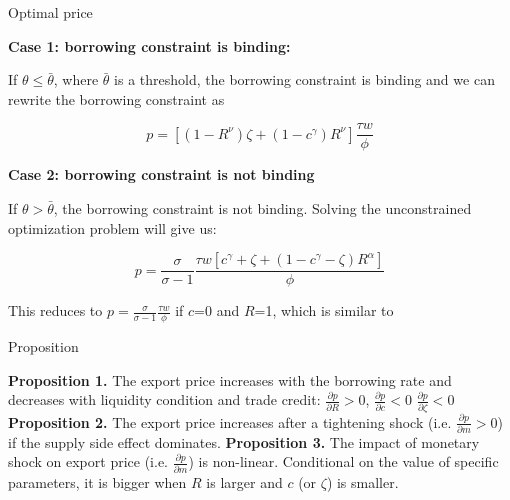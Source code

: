 \documentclass[10pt]{beamer}
\begin{document}
\begin{frame}{Optimal price}

\textbf{Case 1: borrowing constraint is binding: }

If $\theta\leq\bar{\theta}$, where $\bar{\theta}$ is a threshold, the borrowing constraint is binding and we can rewrite the borrowing constraint as 

\begin{equation}
p=[(1-R^{\nu})\zeta+(1-c^\gamma)R^{\nu}] \frac{\tau w}{\phi}
\end{equation}

\textbf{Case 2: borrowing constraint is not binding}

If $\theta>\bar{\theta}$, the borrowing constraint is not binding. Solving the unconstrained optimization problem will give us:

\begin{equation}
p=\frac{\sigma}{\sigma-1}\frac{\tau w [c^\gamma+\zeta+(1-c^\gamma-\zeta) R^\alpha]}{\phi}
\end{equation}

This reduces to $p=\frac{\sigma}{\sigma-1}\frac{\tau w}{\phi}$ if $c$=0 and $R$=1, which is similar to \cite{melitz2003impact} 

\end{frame}


\begin{frame}{Proposition}

\textbf{Proposition 1.} The export price increases with the borrowing rate and decreases with liquidity condition and trade credit: $\frac{\partial p}{\partial R}>0$, $\frac{\partial p}{\partial c}<0$ $\frac{\partial p}{\partial \zeta}<0$
\vfill
\textbf{Proposition 2.} The export price increases after a tightening shock (i.e. $\frac{\partial p}{\partial m}>0$) if the supply side effect dominates.
\vfill
\textbf{Proposition 3.} The impact of monetary shock on export price (i.e. $\frac{\partial p}{\partial m}$) is non-linear. Conditional on the value of specific parameters, it is bigger when $R$ is larger and $c$ (or $\zeta$) is smaller.

\end{frame}
\end{document}
